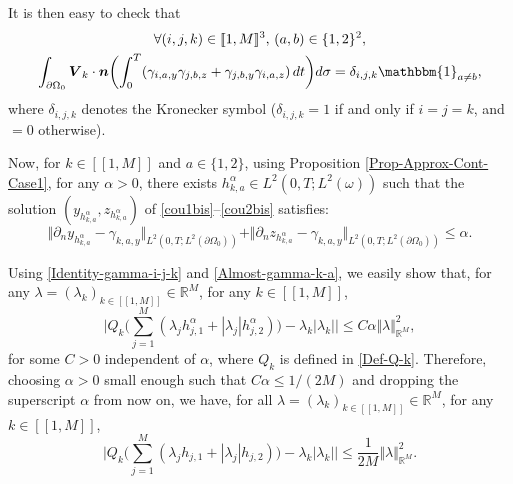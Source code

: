 \documentclass[JEP,XML,SOM,Unicode,NoFloatCountersInSection]{cedram}
\newcommand{\llbracket}{[\![}
\newcommand{\rrbracket}{]\!]}
\newcommand{\bn}{\boldsymbol{n}}
\newcommand{\bV}{\boldsymbol{V}}
\newcommand\R{{\mathbb R}}
\newcommand{\norm}[1]{\Vert#1\Vert}
\theoremstyle{definition}
\begin{document}
It is then easy to check that
\begin{multline}
\label{Identity-gamma-i-j-k}
\forall (i,j,k) \in \llbracket 1,M \rrbracket^3, \, (a,b) \in \{1,2\}^2,
\\
\int_{\partial \Omega_0} \bV_k \cdot \bn \biggl(\int_0^T (\gamma_{i,a, y} \gamma_{j,b,z} + \gamma_{j,b,y} \gamma_{i,a,z}) \, dt \biggr) d \sigma
= \delta_{i,j,k} \mathbbm{1}_{a \neq b},
\end{multline}
where $ \delta_{i,j,k}$ denotes {the Kronecker symbol ($\delta_{i,j,k} = 1$ if and only if $i = j = k$, and $=0$ otherwise).}

Now, for $k \in \llbracket 1,M \rrbracket $ and $a \in \{1, 2\}$, using Proposition \ref{Prop-Approx-Cont-Case1}, for any ${\alpha} >0$, there \hbox{exists} $h_{k,a}^{{\alpha}}\!\in\!L^2(0,T; L^2(\omega))$ such that the solution $(y_{h_{k,a}^{\alpha}}, z_{h_{k,a}^{\alpha}})$ of \eqref{cou1bis}--\eqref{cou2bis} satisfies:
\begin{equation}
\label{Almost-gamma-k-a}
\norm{\partial_n y_{h_{k,a}^{\alpha}} - \gamma_{k,a,y}}_{L^2(0,T; L^2(\partial \Omega_0))}
+
\norm{\partial_n z_{h_{k,a}^{\alpha}} - \gamma_{k,a,y}}_{L^2(0,T; L^2(\partial \Omega_0))}
\leq
{\alpha}.
\end{equation}

Using \eqref{Identity-gamma-i-j-k} and \eqref{Almost-gamma-k-a}, we easily show that, for any $\lambda = (\lambda_{k})_{k \in \llbracket 1,M \rrbracket } \in \R^{M}$, for any $k \in \llbracket 1,M \rrbracket $,
\[
\biggl|
Q_k \biggl(\sum_{j = 1}^M (\lambda_{j} h_{j,1}^{\alpha} + |\lambda_{j}| h_{j,2}^{\alpha}) \biggr)
-
\lambda_k |\lambda_k|
\biggr|
\leq
C {\alpha} \norm{\lambda}_{\R^M}^2,
\]
for some $C >0$ independent of ${\alpha}$, where $Q_k$ is defined in \eqref{Def-Q-k}. Therefore, choosing ${\alpha} >0$ small enough such that $C {\alpha} \leq 1/(2M)$ and dropping the superscript ${\alpha}$ from now on, we have, for all $\lambda = (\lambda_{k})_{k \in \llbracket 1,M \rrbracket } \in \R^{M}$, for any $k \in \llbracket 1,M \rrbracket $,
\begin{equation}
\label{Key-Estimate-Q-k}
\biggl|
Q_k \biggl(\sum_{j = 1}^M (\lambda_{j} h_{j,1} + |\lambda_{j}| h_{j,2}) \biggr)
-
\lambda_k |\lambda_k|
\biggr|
\leq
\frac{1}{2M} \norm{\lambda}_{\R^M}^2.
\end{equation}
\end{document}
